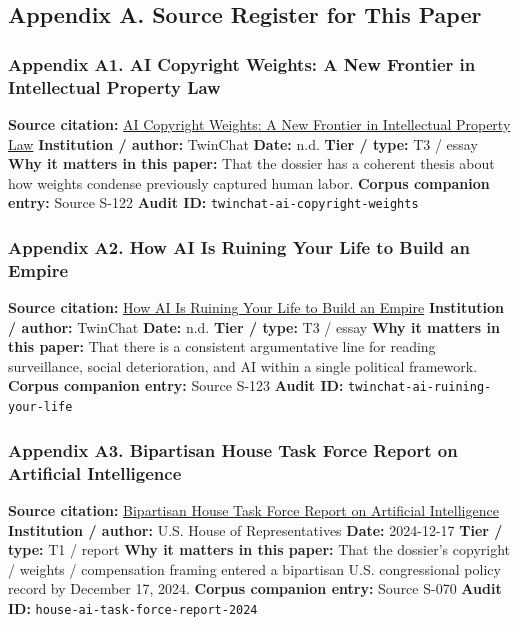 \documentclass[
  american,
  11pt,
  letterpaper,
]{article}
\begin{document}
\subsection{Appendix A. Source Register for This
Paper}\label{appendix-a.-source-register-for-this-paper}

\subsubsection{Appendix A1. AI Copyright Weights: A New Frontier in
Intellectual Property
Law}\label{ch-00-appendix-a1-ai-copyright-weights-a-new-frontier-in-intellectual-property-law}

\textbf{Source citation:}
\href{https://medium.com/twinchat/ai-copyright-weights-a-new-frontier-in-intellectual-property-law-d8ee1b6c55ee}{AI
Copyright Weights: A New Frontier in Intellectual Property Law}
\textbf{Institution / author:} TwinChat \textbf{Date:} n.d. \textbf{Tier
/ type:} T3 / essay \textbf{Why it matters in this paper:} That the
dossier has a coherent thesis about how weights condense previously
captured human labor. \textbf{Corpus companion entry:} Source S-122
\textbf{Audit ID:} \texttt{twinchat-ai-copyright-weights}

\subsubsection{Appendix A2. How AI Is Ruining Your Life to Build an
Empire}\label{ch-00-appendix-a2-how-ai-is-ruining-your-life-to-build-an-empire}

\textbf{Source citation:}
\href{https://medium.com/twinchat/how-ai-is-ruining-your-life-to-build-an-empire-8b6d02e55bc9}{How
AI Is Ruining Your Life to Build an Empire} \textbf{Institution /
author:} TwinChat \textbf{Date:} n.d. \textbf{Tier / type:} T3 / essay
\textbf{Why it matters in this paper:} That there is a consistent
argumentative line for reading surveillance, social deterioration, and
AI within a single political framework. \textbf{Corpus companion entry:}
Source S-123 \textbf{Audit ID:} \texttt{twinchat-ai-ruining-your-life}

\subsubsection{Appendix A3. Bipartisan House Task Force Report on
Artificial
Intelligence}\label{ch-00-appendix-a3-bipartisan-house-task-force-report-on-artificial-intelligence}

\textbf{Source citation:}
\href{https://www.speaker.gov/wp-content/uploads/2024/12/AI-Task-Force-Report-FINAL.pdf}{Bipartisan
House Task Force Report on Artificial Intelligence} \textbf{Institution
/ author:} U.S. House of Representatives \textbf{Date:} 2024-12-17
\textbf{Tier / type:} T1 / report \textbf{Why it matters in this paper:}
That the dossier's copyright / weights / compensation framing entered a
bipartisan U.S. congressional policy record by December 17, 2024.
\textbf{Corpus companion entry:} Source S-070 \textbf{Audit ID:}
\texttt{house-ai-task-force-report-2024}
\end{document}

